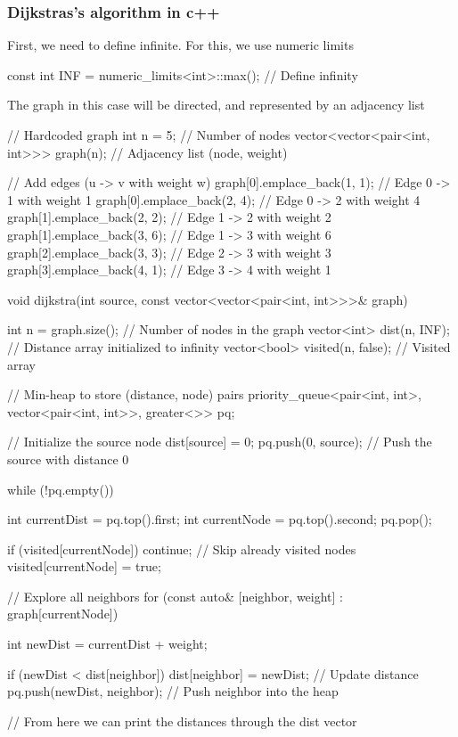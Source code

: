 \documentclass{report}
\begin{document}
\subsubsection{Dijkstras's algorithm in c++}
\bigbreak \noindent 
First, we need to define infinite. For this, we use numeric limits
\bigbreak \noindent 
\begin{cppcode}
    const int INF = numeric_limits<int>::max(); // Define infinity
\end{cppcode}
\bigbreak \noindent 
The graph in this case will be directed, and represented by an adjacency list
\bigbreak \noindent 
\begin{cppcode}
    // Hardcoded graph
    int n = 5; // Number of nodes
    vector<vector<pair<int, int>>> graph(n); // Adjacency list (node, weight)

    // Add edges (u -> v with weight w)
    graph[0].emplace_back(1, 1); // Edge 0 -> 1 with weight 1
    graph[0].emplace_back(2, 4); // Edge 0 -> 2 with weight 4
    graph[1].emplace_back(2, 2); // Edge 1 -> 2 with weight 2
    graph[1].emplace_back(3, 6); // Edge 1 -> 3 with weight 6
    graph[2].emplace_back(3, 3); // Edge 2 -> 3 with weight 3
    graph[3].emplace_back(4, 1); // Edge 3 -> 4 with weight 1
\end{cppcode}
\bigbreak \noindent 
\pagebreak \bigbreak \noindent 
\begin{cppcode}
    void dijkstra(int source, const vector<vector<pair<int, int>>>& graph) {
        int n = graph.size(); // Number of nodes in the graph
        vector<int> dist(n, INF); // Distance array initialized to infinity
        vector<bool> visited(n, false); // Visited array

        // Min-heap to store (distance, node) pairs
        priority_queue<pair<int, int>, vector<pair<int, int>>, greater<>> pq;

        // Initialize the source node
        dist[source] = 0;
        pq.push({0, source}); // Push the source with distance 0

        while (!pq.empty()) {
            int currentDist = pq.top().first;
            int currentNode = pq.top().second;
            pq.pop();

            if (visited[currentNode]) continue; // Skip already visited nodes
            visited[currentNode] = true;

            // Explore all neighbors
        for (const auto& [neighbor, weight] : graph[currentNode]) {
            int newDist = currentDist + weight;

            if (newDist < dist[neighbor]) {
                dist[neighbor] = newDist; // Update distance
                pq.push({newDist, neighbor}); // Push neighbor into the heap
            }
        }
    }
    // From here we can print the distances through the dist vector
}
\end{cppcode}
\end{document}
